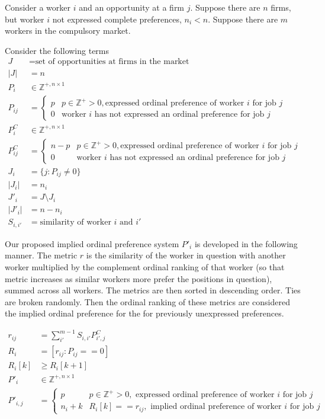 Consider a worker $i$ and an opportunity at a firm $j$. Suppose there are $n$ firms, but worker $i$ not expressed complete preferences, $n_i < n$. Suppose there are $m$ workers in the compulsory market.

Consider the following terms 
\begin{align*}
J &= \text{set of opportunities at firms in the market} \\
|J| &= n \\
P_i & \in \mathbb{Z}^{+, n \times 1} \\
P_{ij} &= \begin{cases}
p & p \in \mathbb{Z}^+ > 0, \text{expressed ordinal preference of worker $i$ for job $j$}\\
0 & \text{worker $i$ has not expressed an ordinal preference for job $j$}
\end{cases} \\
P^C_i & \in \mathbb{Z}^{+, n \times 1} \\
P^C_{ij} &= \begin{cases}
n-p & p \in \mathbb{Z}^+ > 0, \text{expressed ordinal preference of worker $i$ for job $j$}\\
0 & \text{worker $i$ has not expressed an ordinal preference for job $j$}
\end{cases} \\
J_i &= \{j : P_{ij} \neq 0\} \\
|J_i| &= n_i \\
J'_i &= J \setminus J_i \\
|J'_i| &= n - n_i \\
S_{i, i'} &= \text{similarity of worker $i$ and $i'$}
\end{align*}

Our proposed implied ordinal preference system $P'_i$ is developed in the following manner. The metric $r$ is the similarity of the worker in question with another worker multiplied by the complement ordinal ranking of that worker (so that metric increases as similar workers more prefer the positions in question), summed across all workers. The metrics are then sorted in descending order. Ties are broken randomly. Then the ordinal ranking of these metrics are considered the implied ordinal preference for the for previously unexpressed preferences.

\begin{align*}
r_{ij} &= \sum_{i'}^{m-1}S_{i,i'} P^C_{i',j} \\
R_i &= [r_{ij}: P_{ij} == 0] \\
R_i[k] & \geq R_i[k+1] \\
P'_i & \in \mathbb{Z}^{+, n \times 1} \\
P'_{i,j} &= \begin{cases}
p & p \in \mathbb{Z}^+ > 0, \text{ expressed ordinal preference of worker $i$ for job $j$}\\
n_i + k & R_i[k] == r_{ij}, \text{ implied ordinal preference of worker $i$ for job $j$}
\end{cases} \\
\end{align*}
